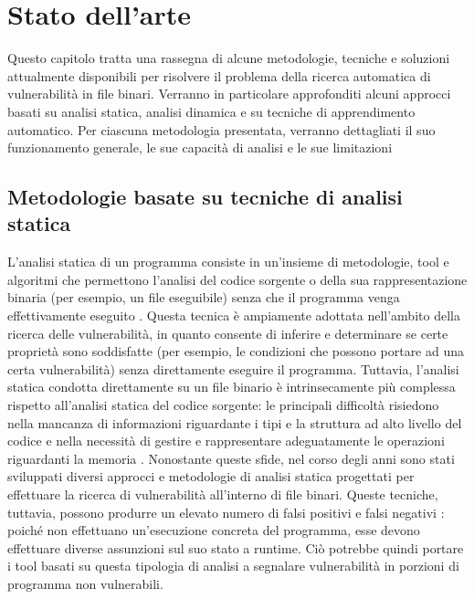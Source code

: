 \documentclass[../main.tex]{subfiles}
\begin{document}
\chapter{Stato dell'arte}
\label{chap:related}
Questo capitolo tratta una rassegna di alcune metodologie, tecniche e soluzioni attualmente disponibili per risolvere il problema della ricerca automatica di vulnerabilità in file binari.
Verranno in particolare approfonditi alcuni approcci basati su analisi statica, analisi dinamica e su tecniche di apprendimento automatico.
Per ciascuna metodologia presentata, verranno dettagliati il suo funzionamento generale, le sue capacità di analisi e le sue limitazioni

\section{Metodologie basate su tecniche di analisi statica}
L'analisi statica di un programma consiste in un'insieme di metodologie, tool e algoritmi che permettono l'analisi del codice sorgente o della
sua rappresentazione binaria (per esempio, un file eseguibile) senza che il programma venga effettivamente eseguito \cite{static_analysis_introduction}.
Questa tecnica è ampiamente adottata nell'ambito della ricerca delle vulnerabilità, in quanto consente di inferire e determinare se
certe proprietà sono soddisfatte (per esempio, le condizioni che possono portare ad una certa vulnerabilità) senza direttamente eseguire il programma.
Tuttavia, l'analisi statica condotta direttamente su un file binario è intrinsecamente più complessa rispetto all'analisi statica del codice sorgente:
le principali difficoltà risiedono nella mancanza di informazioni riguardante i tipi e la struttura ad alto livello del codice \cite{Review_of_static_analysis} e nella necessità di gestire e rappresentare adeguatamente le operazioni riguardanti la memoria \cite{CodeSurfer}.
Nonostante queste sfide, nel corso degli anni sono stati sviluppati diversi approcci e metodologie di analisi statica progettati per effettuare la ricerca di vulnerabilità all'interno di file binari.
Queste tecniche, tuttavia, possono produrre un elevato numero di falsi positivi e falsi negativi : poiché non effettuano un'esecuzione concreta del programma,
esse devono effettuare diverse assunzioni sul suo stato a runtime. Ciò potrebbe quindi portare i tool basati su questa tipologia di analisi a segnalare vulnerabilità in porzioni di programma non vulnerabili.
\end{document}
